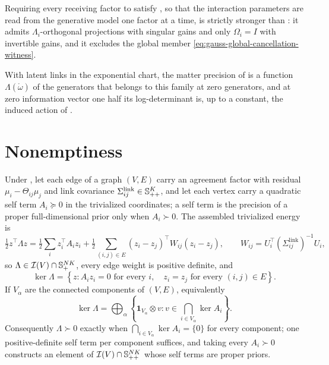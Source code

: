 Requiring every receiving factor to satisfy
, so that the interaction
parameters are read from the generative model one factor at a time, is
strictly stronger than : it admits
\(\Lambda_i\)-orthogonal projections with singular gains and only
\(\Omega_i=I\) with invertible gains, and it excludes the global member
\eqref{eq:gauss-global-cancellation-witness}. 

With latent links in the exponential chart, the matter precision of
 is a function \(\Lambda(\mathring\omega)\) of the
generators that belongs to this family at zero generators, and at zero
information vector one half its log-determinant is, up to a constant, the
induced action of .

\section{Nonemptiness}
\label{sec:gauss-nonempty}

Under , let each edge of a graph \((V,E)\)
carry an agreement factor with residual \(\mu_i-\Theta_{ij}\mu_j\) and link
covariance \(\Sigma^{\mathrm{link}}_{ij}\in\mathbb S_{++}^{K}\), and let each vertex
carry a quadratic self term \(A_i\succeq0\) in the trivialized coordinates; a
self term is the precision of a proper full-dimensional prior only when
\(A_i\succ0\). The assembled trivialized energy is
\begin{equation}
\tfrac12z^\top\Lambda z=\tfrac12\sum_{i}z_i^\top A_iz_i
+\tfrac12\sum_{(i,j)\in E}\left(z_i-z_j\right)^\top W_{ij}\left(z_i-z_j\right),
\qquad
W_{ij}=U_i^\top(\Sigma^{\mathrm{link}}_{ij})^{-1}U_i,
\label{eq:gauss-nonempty-construction}
\end{equation}
so \(\Lambda\in\mathcal I(V)\cap\mathbb S_{+}^{NK}\), every edge weight is positive
definite, and
\begin{equation}
\ker\Lambda
=\left\{z:A_iz_i=0\text{ for every }i,
\quad z_i=z_j\text{ for every }(i,j)\in E\right\}.
\label{eq:gauss-nonempty-kernel}
\end{equation}
If \(V_\alpha\) are the connected components of \((V,E)\), equivalently
\begin{equation}
\ker\Lambda
=\bigoplus_\alpha
\left\{\mathbf1_{V_\alpha}\otimes v:
v\in\bigcap_{i\in V_\alpha}\ker A_i\right\}.
\label{eq:gauss-nonempty-component-kernel}
\end{equation}
Consequently \(\Lambda\succ0\) exactly when
\(\bigcap_{i\in V_\alpha}\ker A_i=\{0\}\) for every component; one
positive-definite self term per component suffices, and taking every
\(A_i\succ0\) constructs an element of \(\mathcal I(V)\cap\mathbb S_{++}^{NK}\) whose
self terms are proper priors. 

